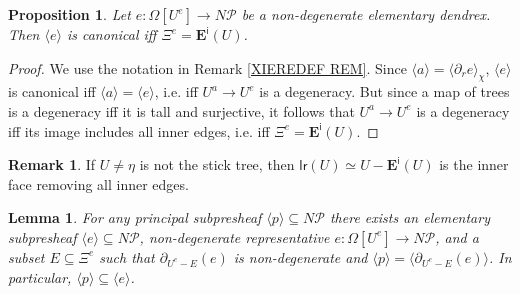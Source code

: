 \documentclass[a4paper,10pt
,draft
]{article}%
\numberwithin{equation}{section}
\numberwithin{figure}{section}
\newtheorem{lemma}[equation]{Lemma}%
\newtheorem{proposition}[equation]{Proposition}%
\theoremstyle{definition} %
\newtheorem{remark}[equation]{Remark}%
\newcommand{\1}{\ensuremath{\mathbbm 1}}%
\begin{document}
\begin{proposition}\label{CANIFFXIE PROP}
	Let $e \colon \Omega[U^e] \to N \mathcal{P}$ be a non-degenerate elementary dendrex.
	Then $\langle e \rangle$
	is canonical iff $\Xi^e = \boldsymbol{E}^{\mathsf{i}}(U)$.
\end{proposition}

\begin{proof}
	We use the notation in Remark \ref{XIEREDEF REM}.
	Since $\langle a\rangle = \langle \partial_r e \rangle_{\chi}$, 
	$\langle e \rangle$
	is canonical 
	iff
	$\langle a\rangle = \langle e \rangle$, i.e.
	iff
	$U^a \to U^e$ is a degeneracy. 
	But since a map of trees is a degeneracy iff it is tall and surjective,
	it follows that $U^a \to U^e$ is a degeneracy
	iff its image includes all inner edges, i.e. iff $\Xi^e = \boldsymbol{E}^{\mathsf{i}}(U)$.
\end{proof}



\begin{remark}\label{WHENLRINN REM}
	If $U\neq \eta$ is not the stick tree,
	then $\mathsf{lr}(U) \simeq U - \boldsymbol{E}^{\mathsf{i}}(U)$
	is the inner face removing all inner edges.
\end{remark}



\begin{lemma}\label{ELEMEXIST LEM}
	For any principal subpresheaf $\langle p \rangle \subseteq N \mathcal{P}$
	there exists an elementary subpresheaf
	$\langle e \rangle \subseteq N \mathcal P$, 
	non-degenerate representative 
	$e \colon \Omega[U^e] \to N \mathcal{P}$,
	and a subset $E \subseteq \Xi^{e}$
	such that
	$\partial_{U^e-E} (e)$ is non-degenerate and 
	$\langle p \rangle = \langle \partial_{U^e-E} (e) \rangle$.
	In particular,  
	$\langle p \rangle \subseteq \langle e \rangle$.
\end{lemma}
\end{document}
